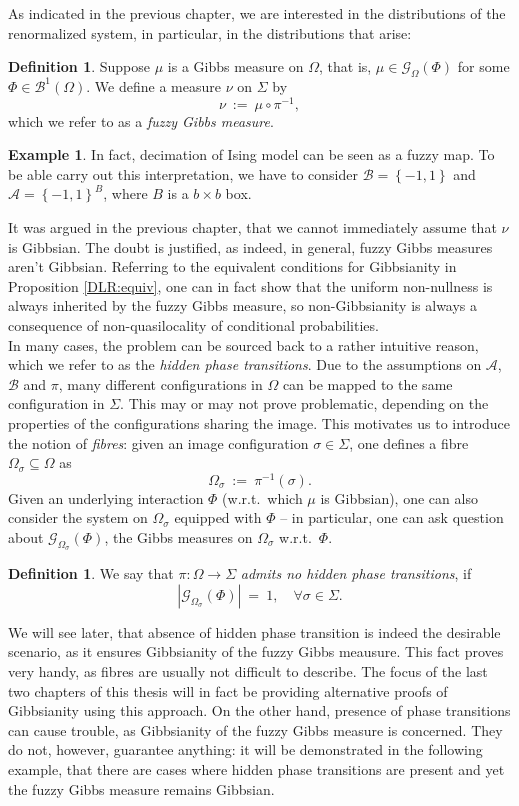 \documentclass[12pt]{article}
\newcommand{\A}{\mathcal{A}}
\newcommand{\B}{\mathcal{B}}
\newcommand{\BB}{\mathscr{B}}
\newcommand{\G}{\mathcal{G}}
\newcommand{\set}[1]{\left\{#1\right\}}
\newcommand{\ra}{\rightarrow}
\newcommand{\1}{\mathbbm{1}}
\newcommand{\5}{\vspace{0.5cm}}
\theoremstyle{definition}
\newtheorem{ex}[thm]{Example}
\newtheorem{df}[thm]{Definition}
\begin{document}
As indicated in the previous chapter, we are interested in the distributions of the renormalized system, in particular, in the distributions that arise:
\begin{df}
Suppose $\mu$ is a Gibbs measure on $\Omega$, that is, $\mu\in\G_\Omega(\Phi)$ for some $\Phi\in\BB^1(\Omega)$. We define a measure $\nu$ on $\Sigma$ by
$$\nu ~:=~ \mu \circ \pi^{-1},$$
which we refer to as a \textit{fuzzy Gibbs measure}.
\end{df}
\begin{ex}
In fact, decimation of Ising model can be seen as a fuzzy map. To be able carry out this interpretation, we have to consider $\B=\set{-1,1}$ and $\A=\set{-1,1}^{B}$, where $B$ is a $b\times b$ box.
\end{ex}
It was argued in the previous chapter, that we cannot immediately assume that $\nu$ is Gibbsian. The doubt is justified, as indeed, in general, fuzzy Gibbs measures aren't Gibbsian. Referring to the equivalent conditions for Gibbsianity in Proposition \ref{DLR:equiv}, one can in fact show that the uniform non-nullness is always inherited by the fuzzy Gibbs measure, so non-Gibbsianity is always a consequence of non-quasilocality of conditional probabilities. \\

In many cases, the problem can be sourced back to a rather intuitive reason, which we refer to as the \textit{hidden phase transitions}. Due to the assumptions on $\A$, $\B$ and $\pi$, many different configurations in $\Omega$ can be mapped to the same configuration in $\Sigma$. This may or may not prove problematic, depending on the properties of the configurations sharing the image. This motivates us to introduce the notion of \textit{fibres}: given an image configuration $\sigma\in\Sigma$, one defines a fibre $\Omega_\sigma\subseteq\Omega$ as
$$\Omega_\sigma ~:=~ \pi^{-1}(\sigma).$$
Given an underlying interaction $\Phi$ (w.r.t.~which $\mu$ is Gibbsian), one can also consider the system on $\Omega_\sigma$ equipped with $\Phi$ -- in particular, one can ask question about $\G_{\Omega_\sigma}(\Phi)$, the Gibbs measures on $\Omega_\sigma$ w.r.t.~$\Phi$. 
\begin{df}
We say that $\pi:\Omega\ra\Sigma$ \textit{admits no hidden phase transitions}, if 
$$|\G_{\Omega_\sigma}(\Phi)| ~=~ 1, \quad \forall \sigma\in\Sigma.$$
\end{df}
We will see later, that absence of hidden phase transition is indeed the desirable scenario, as it ensures Gibbsianity of the fuzzy Gibbs meausure. This fact proves very handy, as fibres are usually not difficult to describe. The focus of the last two chapters of this thesis will in fact be providing alternative proofs of Gibbsianity using this approach. On the other hand, presence of phase transitions can cause trouble, as Gibbsianity of the fuzzy Gibbs measure is concerned. They do not, however, guarantee anything: it will be demonstrated in the following example, that there are cases where hidden phase transitions are present and yet the fuzzy Gibbs measure remains Gibbsian.
\end{document}
